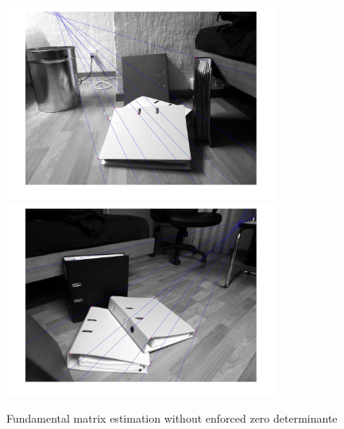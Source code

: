\documentclass[12pt]{article}
\begin{document}
\begin{figure}[ht]
	\centering
	\includegraphics[width=0.8\textwidth]{F1Book.jpg}
	\includegraphics[width=0.8\textwidth]{F2Book.jpg}
	\caption{Fundamental matrix estimation without enforced zero determinante}
	\label{fig1}
\end{figure}
\vspace{5mm}
\end{document}
